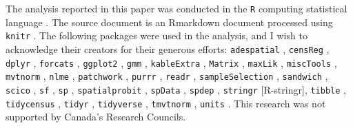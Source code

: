 \documentclass[preprint, 3p,
authoryear]{elsarticle} %
\begin{document}
The analysis reported in this paper was conducted in the \texttt{R}
computing statistical language \citep{R-base}. The source document is an
Rmarkdown document \citep{rmarkdown2018, rmarkdown2020} processed using
\texttt{knitr} \citep{knitr2015, knitr2014}. The following packages were
used in the analysis, and I wish to acknowledge their creators for their
generous efforts: \texttt{adespatial} \citep{R-adespatial},
\texttt{censReg} \citep{R-censReg}, \texttt{dplyr} \citep{R-dplyr},
\texttt{forcats} \citep{R-forcats}, \texttt{ggplot2}
\citep{ggplot22016}, \texttt{gmm} \citep{gmm2010}, \texttt{kableExtra}
\citep{R-kableExtra}, \texttt{Matrix} \citep{R-Matrix}, \texttt{maxLik}
\citep{maxLik2011}, \texttt{miscTools} \citep{R-miscTools},
\texttt{mvtnorm} \citep{mvtnorm2009}, \texttt{nlme} \citep{R-nlme},
\texttt{patchwork} \citep{R-patchwork}, \texttt{purrr} \citep{R-purrr},
\texttt{readr} \citep{R-readr}, \texttt{sampleSelection}
\citep{sampleSelection2008}, \texttt{sandwich}
\citep{sandwich2020, sandwich2004, sandwich2006}, \texttt{scico}
\citep{R-scico}, \texttt{sf} \citep{sf2018}, \texttt{sp}
\citep{sp2005, sp2013}, \texttt{spatialprobit} \citep{R-spatialprobit},
\texttt{spData} \citep{R-spData}, \texttt{spdep}
\citep{spdep2018, spdep2013}, \texttt{stringr} {[}R-stringr{]},
\texttt{tibble} \citep{R-tibble}, \texttt{tidycensus}
\citep{R-tidycensus}, \texttt{tidyr} \citep{R-tidyr}, \texttt{tidyverse}
\citep{tidyverse2019}, \texttt{tmvtnorm} \citep{R-tmvtnorm},
\texttt{units} \citep{units2016}. This research was not supported by
Canada's Research Councils.

\renewcommand\refname{References}

\end{document}
